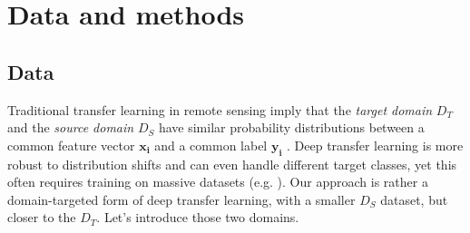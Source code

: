 \documentclass[journal]{IEEEtran}
\begin{document}
\section{Data and methods}
\subsection{Data}
Traditional transfer learning in remote sensing imply that the \textit{target domain} $\mathit{D}_T$ and the \textit{source domain} $\mathit{D}_S$ have similar probability distributions 
between a common feature vector $\mathbf{x_i}$ and a common label $\mathbf{y_i}$ \cite{tuiaDomainAdaptationClassification2016}. Deep transfer learning is more robust to distribution shifts 
and can even handle different target classes, yet this often requires training on massive datasets (e.g. \cite{heDeepResidualLearning2015,kirillovSegmentAnything2023}). 
Our approach is rather a domain-targeted form of deep transfer learning, with a smaller $\mathit{D}_S$ dataset, but closer to the $\mathit{D}_T$. Let's introduce those two domains.
\end{document}
